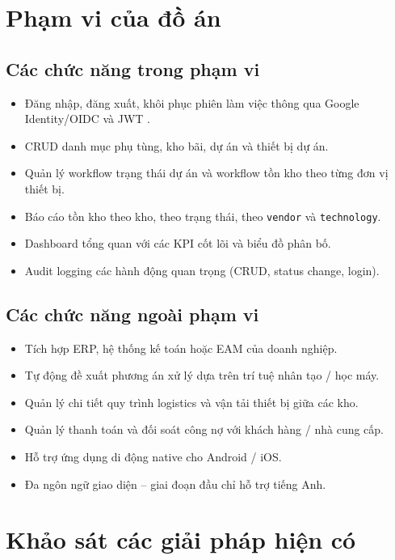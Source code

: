 \section{Phạm vi của đồ án}
\label{sec:phamvi}

\subsection{Các chức năng trong phạm vi}
\begin{itemize}[leftmargin=1.2cm]
    \item Đăng nhập, đăng xuất, khôi phục phiên làm việc thông qua Google Identity/OIDC và JWT \cite{rfc7519}.
    \item CRUD danh mục phụ tùng, kho bãi, dự án và thiết bị dự án.
    \item Quản lý workflow trạng thái dự án và workflow tồn kho theo từng đơn vị thiết bị.
    \item Báo cáo tồn kho theo kho, theo trạng thái, theo \texttt{vendor} và \texttt{technology}.
    \item Dashboard tổng quan với các KPI cốt lõi và biểu đồ phân bố.
    \item Audit logging các hành động quan trọng (CRUD, status change, login).
\end{itemize}

\subsection{Các chức năng ngoài phạm vi}
\begin{itemize}[leftmargin=1.2cm]
    \item Tích hợp ERP, hệ thống kế toán hoặc EAM của doanh nghiệp.
    \item Tự động đề xuất phương án xử lý dựa trên trí tuệ nhân tạo / học máy.
    \item Quản lý chi tiết quy trình logistics và vận tải thiết bị giữa các kho.
    \item Quản lý thanh toán và đối soát công nợ với khách hàng / nhà cung cấp.
    \item Hỗ trợ ứng dụng di động native cho Android / iOS.
    \item Đa ngôn ngữ giao diện -- giai đoạn đầu chỉ hỗ trợ tiếng Anh.
\end{itemize}

\section{Khảo sát các giải pháp hiện có}
\label{sec:khaosat}

